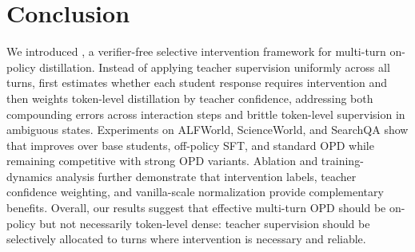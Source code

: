 \section{Conclusion}
We introduced \ours, a verifier-free selective intervention framework for multi-turn on-policy distillation.
%
Instead of applying teacher supervision uniformly across all turns, \ours first estimates whether each student response requires intervention and then weights token-level distillation by teacher confidence, addressing both compounding errors across interaction steps and brittle token-level supervision in ambiguous states. 
%
Experiments on ALFWorld, ScienceWorld, and SearchQA show that \ours improves over base students, off-policy SFT, and standard OPD while remaining competitive with strong OPD variants. 
%
Ablation and training-dynamics analysis further demonstrate that intervention labels, teacher confidence weighting, and vanilla-scale normalization provide complementary benefits. 
%
Overall, our results suggest that effective multi-turn OPD should be on-policy but not necessarily token-level dense: teacher supervision should be selectively allocated to turns where intervention is necessary and reliable.
%